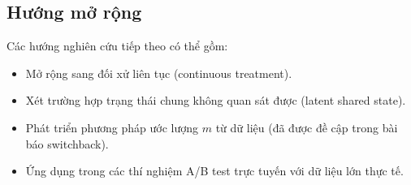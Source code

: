\subsection{Hướng mở rộng}

Các hướng nghiên cứu tiếp theo có thể gồm:
\begin{itemize}
    \item Mở rộng sang đối xử liên tục (continuous treatment).
    \item Xét trường hợp trạng thái chung không quan sát được (latent shared state).
    \item Phát triển phương pháp ước lượng \(m\) từ dữ liệu (đã được đề cập trong bài báo switchback).
    \item Ứng dụng trong các thí nghiệm A/B test trực tuyến với dữ liệu lớn thực tế.
\end{itemize}
